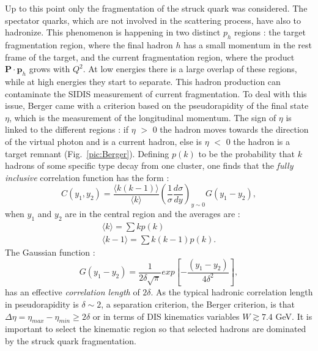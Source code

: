 Up to this point only the fragmentation of the struck quark was considered. The spectator quarks, which are not involved in the scattering process, have also to hadronize. This phenomenon is happening in two distinct $p_h$ regions : the target fragmentation region, where the final hadron $h$ has a small momentum in the rest frame of the target, and the current fragmentation region, where the product $\textbf{P}\cdot\textbf{p}_h$ grows with $Q^2$. At low energies there is a large overlap of these regions, while at high energies they start to separate. This hadron production can contaminate the SIDIS measurement of current fragmentation. To deal with this issue, Berger \cite{BERGER} came with a criterion based on the pseudorapidity of the final state $\eta$, which is the measurement of the longitudinal momentum. The sign of $\eta$ is linked to the different regions : if $\eta$ $>$ $0$ the hadron moves towards the direction of the virtual photon and is a current hadron, else is $\eta$ $<$ $0$ the hadron is a target remnant (Fig.~\ref{pic:Berger}). Defining $p(k)$ to be the probability that $k$ hadrons of some specific type decay from one cluster, one finds that the \textit{fully inclusive} correlation function has the form :
%
\begin{equation}
  C(y_1,y_2) = \frac{\langle k(k-1) \rangle}{\langle k \rangle} \left(\frac{1}{\sigma}\frac{d\sigma}{dy}\right)_{y\sim 0} G(y_1-y_2),
\end{equation}
%
when $y_1$ and $y_2$ are in the central region and the averages are :
%
\begin{equation}
  \begin{split}
    \langle k \rangle = \sum kp(k) \\
    \langle k-1 \rangle = \sum k(k-1)p(k).
  \end{split}
\end{equation}
%
The Gaussian function :
%
\begin{equation}
  G(y_1-y_2) = \frac{1}{2\delta \sqrt{\pi}}exp\left[-\frac{\left(y_1-y_2\right)}{4\delta^2}\right],
\end{equation}
%
has an effective \textit{correlation length} of $2\delta$. As the typical hadronic correlation length in pseudorapidity is $\delta \sim 2$, a separation criterion, the Berger criterion, is that $\Delta\eta = \eta_{max}-\eta_{min} \geq 2\delta$ or in terms of DIS kinematics variables $W \gtrsim 7.4$ GeV. It is important to select the kinematic region so that selected hadrons are dominated by the struck quark fragmentation.

